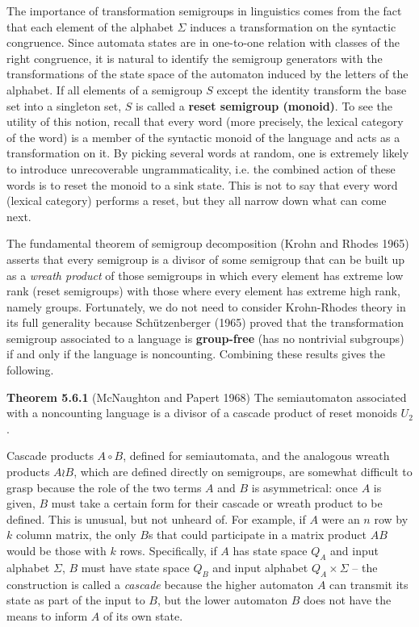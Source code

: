 The importance of transformation semigroups in linguistics comes from the fact
that each element of the alphabet $\Sigma$ induces a transformation on the
syntactic congruence. Since automata states are in one-to-one relation with
classes of the right congruence, it is natural to identify the semigroup
generators with the transformations of the state space of the automaton
induced by the letters of the alphabet. If all elements of a semigroup $S$
except the identity transform the base set into a singleton set, $S$ is
called a {\bf reset semigroup (monoid)}. To see
the utility of this notion, recall that every word (more precisely, the
lexical category of the word) is a member of the syntactic monoid of the
language and acts as a transformation on it. By picking several words at
random, one is extremely likely to introduce unrecoverable ungrammaticality,
i.e. the combined action of these words is to reset the monoid to a sink
state. This is not to say that every word (lexical category) performs a reset,
but they all narrow down what can come next. 

The fundamental theorem of semigroup decomposition (Krohn and Rhodes 1965)
asserts that every semigroup is a divisor of some semigroup that can be built
up as a {\it wreath product} of those semigroups in which every element has
extreme low rank (reset semigroups) with those where every element has extreme
high rank, namely groups. Fortunately, we do not need to consider Krohn-Rhodes
theory in its full generality because Sch\"{u}tzenberger (1965) proved that
the transformation semigroup associated to a language is {\bf group-free}
 (has no nontrivial subgroups) if and only if the language
is noncounting. Combining these results gives the following.
\nocite{Krohn:1965} \nocite{Schu2tzenberge:1965}

\medskip
\noindent
{\bf Theorem 5.6.1} (McNaughton and Papert 1968) The semiautomaton associated
with a noncounting language is a divisor of a cascade product of reset
monoids $U_2$.\nocite{McNaughton:1968}

\smallskip{} Cascade products $A \circ B$, defined for
semiautomata, and the analogous wreath products $A \wr B$, which are defined
directly on semigroups, are somewhat difficult to grasp because the role of
the two terms $A$ and $B$ is asymmetrical: once $A$ is given, $B$ must take a
certain form for their cascade or wreath product to be defined. This is
unusual, but not unheard of. For example, if $A$ were an $n$ row by $k$
column matrix, the only $B$s that could participate in a matrix product $AB$
would be those with $k$ rows. Specifically, if $A$ has state space $Q_A$ and
input alphabet $\Sigma$, $B$ must have state space $Q_B$ and input alphabet
$Q_A \times \Sigma$ -- the construction is called a {\it cascade} because the
higher automaton $A$ can transmit its state as part of the input to $B$, but
the lower automaton $B$ does not have the means to inform $A$ of its own state.

